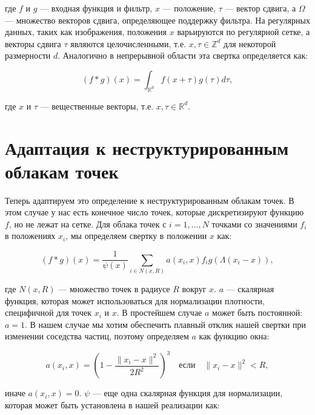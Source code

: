\documentclass[a4paper,12pt]{article}
\theoremstyle{plain} %
\theoremstyle{definition} %
\theoremstyle{remark} %
\begin{document}
где $f$ и $g$ — входная функция и фильтр, $x$ — положение, $\tau$ — вектор сдвига, а $\Omega$ — множество векторов сдвига, определяющее поддержку фильтра. На регулярных данных, таких как изображения, положения $x$ варьируются по регулярной сетке, а векторы сдвига $\tau$ являются целочисленными, т.е. $x, \tau \in \mathbb{Z}^d$ для некоторой размерности $d$. Аналогично в непрерывной области эта свертка определяется как:

\begin{equation}
(f * g)(x) = \int_{\mathbb{R}^d} f(x + \tau) g(\tau) d\tau,
\end{equation}

где $x$ и $\tau$ — вещественные векторы, т.е. $x, \tau \in \mathbb{R}^d$.

\section{Адаптация к неструктурированным облакам точек}
Теперь адаптируем это определение к неструктурированным облакам точек. В этом случае у нас есть конечное число точек, которые дискретизируют функцию $f$, но не лежат на сетке. Для облака точек с $i = 1, \ldots, N$ точками со значениями $f_i$ в положениях $x_i$, мы определяем свертку в положении $x$ как:

\begin{equation}
(f * g)(x) = \frac{1}{\psi(x)} \sum_{i \in N(x, R)} a(x_i, x) f_i g(\Lambda(x_i - x)),
\end{equation}

где $N(x, R)$ — множество точек в радиусе $R$ вокруг $x$. $a$ — скалярная функция, которая может использоваться для нормализации плотности, специфичной для точек $x_i$ и $x$. В простейшем случае $a$ может быть постоянной: $a = 1$. В нашем случае мы хотим обеспечить плавный отклик нашей свертки при изменении соседства частиц, поэтому определяем $a$ как функцию окна:

\begin{equation}
a(x_i, x) = \left(1 - \frac{\|x_i - x\|^2}{2R^2}\right)^3 \quad \text{если} \quad \|x_i - x\|^2 < R,
\end{equation}

иначе $a(x_i, x) = 0$. $\psi$ — еще одна скалярная функция для нормализации, которая может быть установлена в нашей реализации как:
\end{document}
